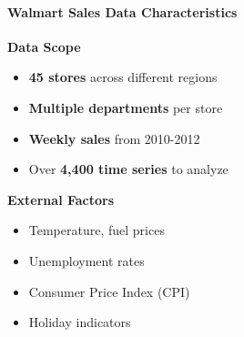 {
	\framesubtitle{Walmart Sales Data Characteristics}
	
	\textbf{Data Scope}
	\begin{itemize}
		\item \textbf{45 stores} across different regions
		\item \textbf{Multiple departments} per store
		\item \textbf{Weekly sales} from 2010-2012
		\item Over \textbf{4,400 time series} to analyze
	\end{itemize}
	
	\textbf{External Factors}
	\begin{itemize}
		\item Temperature, fuel prices
		\item Unemployment rates
		\item Consumer Price Index (CPI)
		\item Holiday indicators
	\end{itemize}
	
	\begin{figure}[!h]
		\centering
		
	\end{figure}
}
